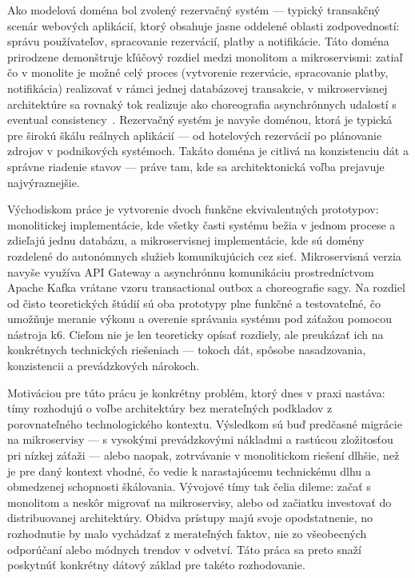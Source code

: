 Ako modelová doména bol zvolený rezervačný systém — typický transakčný scenár webových aplikácií, ktorý obsahuje jasne oddelené oblasti zodpovedností: správu používateľov, spracovanie rezervácií, platby a notifikácie. Táto doména prirodzene demonštruje kľúčový rozdiel medzi monolitom a mikroservismi: zatiaľ čo v monolite je možné celý proces (vytvorenie rezervácie, spracovanie platby, notifikácia) realizovať v rámci jednej databázovej transakcie, v mikroservisnej architektúre sa rovnaký tok realizuje ako choreografia asynchrónnych udalostí s eventual consistency~\cite{Richardson2018}. Rezervačný systém je navyše doménou, ktorá je typická pre širokú škálu reálnych aplikácií — od hotelových rezervácií po plánovanie zdrojov v podnikových systémoch. Takáto doména je citlivá na konzistenciu dát a správne riadenie stavov — práve tam, kde sa architektonická voľba prejavuje najvýraznejšie.

Východiskom práce je vytvorenie dvoch funkčne ekvivalentných prototypov: monolitickej implementácie, kde všetky časti systému bežia v jednom procese a zdieľajú jednu databázu, a mikroservisnej implementácie, kde sú domény rozdelené do autonómnych služieb komunikujúcich cez sieť. Mikroservisná verzia navyše využíva API Gateway a asynchrónnu komunikáciu prostredníctvom Apache Kafka vrátane vzoru transactional outbox a choreografie sagy. Na rozdiel od čisto teoretických štúdií sú oba prototypy plne funkčné a testovateľné, čo umožňuje meranie výkonu a overenie správania systému pod záťažou pomocou nástroja k6. Cieľom nie je len teoreticky opísať rozdiely, ale preukázať ich na konkrétnych technických riešeniach — tokoch dát, spôsobe nasadzovania, konzistencii a prevádzkových nárokoch.

Motiváciou pre túto prácu je konkrétny problém, ktorý dnes v praxi nastáva: tímy rozhodujú o voľbe architektúry bez merateľných podkladov z porovnateľného technologického kontextu. Výsledkom sú buď predčasné migrácie na mikroservisy — s vysokými prevádzkovými nákladmi a rastúcou zložitosťou pri nízkej záťaži — alebo naopak, zotrvávanie v monolitickom riešení dlhšie, než je pre daný kontext vhodné, čo vedie k narastajúcemu technickému dlhu a obmedzenej schopnosti škálovania. Vývojové tímy tak čelia dileme: začať s monolitom a neskôr migrovať na mikroservisy, alebo od začiatku investovať do distribuovanej architektúry. Obidva prístupy majú svoje opodstatnenie, no rozhodnutie by malo vychádzať z merateľných faktov, nie zo všeobecných odporúčaní alebo módnych trendov v odvetví. Táto práca sa preto snaží poskytnúť konkrétny dátový základ pre takéto rozhodovanie.

